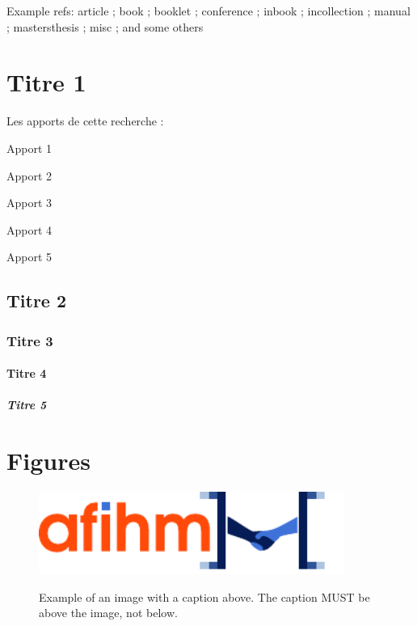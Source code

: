 \documentclass{jips}
\begin{document}
Example refs:
article \citep{article} ;
book \citep{book} ;
booklet \citep{booklet} ;
conference \citep{conference} ;
inbook \citep{inbook} ;
incollection \citep{incollection} ;
manual \citep{manual} ;
mastersthesis \citep{mastersthesis} ;
misc \citep{misc} ;
and some others \citep{phdthesis,proceedings,techreport,unpublished}

\lipsum[1]

\section{Titre 1}

\lipsum[2]

\begin{checklist}{Les apports de cette recherche :}
  \item Apport 1
  \item Apport 2
  \item Apport 3
  \item Apport 4
  \item Apport 5
\end{checklist}

\subsection{Titre 2}

\lipsum[3]

\subsubsection{Titre 3}

\lipsum[4]

\paragraph{Titre 4}

\lipsum[5]

\subparagraph{Titre 5}

\lipsum[6]

\section{Figures}

\lipsum[7]

\begin{figure}[!ht]
    \centering
    \caption{Example of an image with a caption above. The caption MUST be above the image, not below.}
    \includegraphics[width=10cm]{afihm_logo.pdf}
    \label{fig:afihm}
\end{figure}
\end{document}
